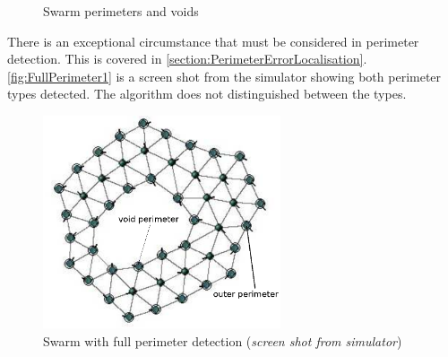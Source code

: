 \begin{figure}[H]
\centering
{}
\caption{Swarm perimeters and voids}
\label{fig:SwarmVoids}
\end{figure}

There is an exceptional circumstance that must be considered in perimeter detection. This is covered in \autoref{section:PerimeterErrorLocalisation}. \autoref{fig:FullPerimeter1} is a screen shot from the simulator showing both perimeter types detected. The algorithm does not distinguished between the types. 

\begin{figure}[H]
\begin{center}
\includegraphics[width=7cm]{CHAPTER-6/figures/FullPerimeter}
\end{center}
\caption[Swarm with full perimeter detection]{Swarm with full perimeter detection (\textit{screen shot from simulator})\label{fig:FullPerimeter1}}
\end{figure}

